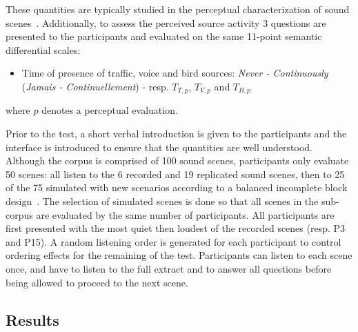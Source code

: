\documentclass[twocolumn]{article}
\begin{document}
These quantities are typically studied in the perceptual characterization of sound scenes~\cite{axelsson2010, aumond2017, nilsson2007}. Additionally, to assess the perceived source activity 3 questions are presented to the participants and evaluated on the same 11-point semantic differential scales:
\begin{itemize}
\item Time of presence of traffic, voice and bird sources: \textit{Never - Continuously} (\textit{Jamais - Continuellement}) - resp. $T_{T, p}$, $T_{V, p}$ and $T_{B, p}$
\end{itemize}
where $p$ denotes a perceptual evaluation.

Prior to the test, a short verbal introduction is given to the participants and the interface is introduced to ensure that the quantities are well understood. Although the corpus is comprised of 100 sound scenes, participants only evaluate 50 scenes: all listen to the 6 recorded and 19 replicated sound scenes, then to 25 of the 75 simulated with new scenarios according to a balanced incomplete block design~\cite{dagnelie2003}. The selection of simulated scenes is done so that all scenes in the sub-corpus are evaluated by the same number of participants. All participants are first presented with the most quiet then loudest of the recorded scenes (resp. P3 and P15). A random listening order is generated for each participant to control ordering effects for the remaining of the test. Participants can listen to each scene once, and have to listen to the full extract and to answer all questions before being allowed to proceed to the next scene.


\subsection{Results}
\label{sec:exp_res}
\end{document}
